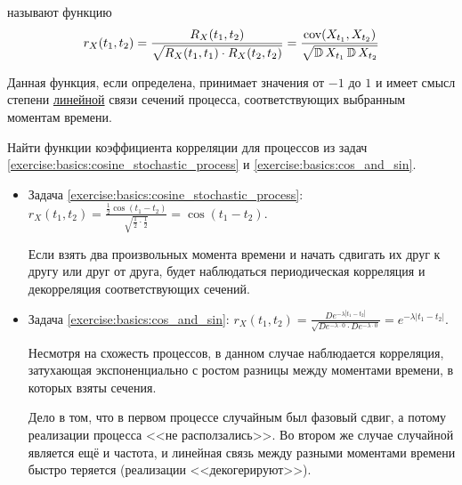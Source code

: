 \begin{definition}
    \label{definition:basics:correlation_coefficient_function}
     называют функцию
    \[
        r_X(t_1, t_2) = \frac{R_X(t_1, t_2)}{\sqrt{R_X(t_1, t_1) \cdot R_X(t_2, t_2)}} = \frac{\textnormal{cov}(X_{t_1}, X_{t_2})}{\sqrt{\operatorname{\mathbb{D}} X_{t_1} \operatorname{\mathbb{D}} X_{t_2}}}
    \]
\end{definition}

Данная функция, если определена, принимает значения от $ -1 $ до $ 1 $
и имеет смысл степени \uline{линейной} связи сечений процесса,
соответствующих выбранным моментам времени.

\begin{Exercise}[counter=SecExercise, label={exercise:basics:correlation_coefficient_function}]
    \noindent
    Найти функции коэффициента корреляции для процессов из задач \ref{exercise:basics:cosine_stochastic_process} и \ref{exercise:basics:cos_and_sin}.
\end{Exercise}

\begin{Answer}
    \noindent
    \begin{itemize}
        \item
            Задача \ref{exercise:basics:cosine_stochastic_process}:
            $
                \displaystyle
                r_X(t_1, t_2) = \frac{\frac{1}{2} \cos(t_1 - t_2)}{\sqrt{\frac{1}{2} \cdot \frac{1}{2}}} = \cos(t_1 - t_2)
            $.

            Если взять два произвольных момента времени и начать сдвигать их друг к другу или друг от друга,
            будет наблюдаться периодическая корреляция и декорреляция соответствующих сечений.
        \item
            Задача \ref{exercise:basics:cos_and_sin}:
            $
                \displaystyle
                r_X(t_1, t_2) = \frac{D e^{-\lambda |t_1 - t_2|}}{\sqrt{D e^{-\lambda \cdot 0} \cdot D e^{-\lambda \cdot 0}}} = e^{-\lambda |t_1 - t_2|}
            $.

            Несмотря на схожесть процессов, в данном случае наблюдается корреляция,
            затухающая экспоненциально с ростом разницы между моментами времени,
            в которых взяты сечения.

            Дело в том, что в первом процессе случайным был фазовый сдвиг, а потому реализации процесса <<не расползались>>.
            Во втором же случае случайной является ещё и частота, и линейная связь между разными моментами времени быстро теряется
            (реализации <<декогерируют>>).
    \end{itemize}
\end{Answer}
